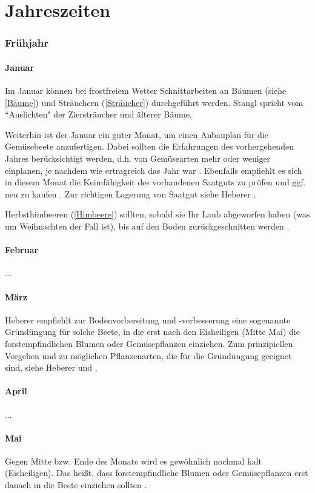 \part{Jahreszeiten}

\pagebreak

\section{Frühjahr}

\subsection{Januar}

Im Januar können bei frostfreiem Wetter Schnittarbeiten an \textrightarrow Bäumen (siehe \ref{Bäume}) und \textrightarrow Sträuchern (\ref{Sträucher}) durchgeführt werden.
Stangl \cite[S.~256]{Stangl1995} spricht vom ``Auslichten" der Ziersträucher und älterer Bäume.

Weiterhin ist der Januar ein guter Monat, um einen Anbauplan für die Gemüsebeete anzufertigen.
Dabei sollten die Erfahrungen des vorhergehenden Jahres berücksichtigt werden, d.h. von Gemüsearten mehr oder weniger einplanen, je nachdem wie ertragreich das Jahr war \cite[S.~256]{Stangl1995}.
Ebenfalls empfiehlt es sich in diesem Monat die Keimfähigkeit des vorhandenen Saatguts zu prüfen und ggf. neu zu kaufen \cite[S.~216]{Heberer2018}.
Zur richtigen Lagerung von Saatgut siehe Heberer \cite[S.~179]{Heberer2018}.

Herbsthimbeeren (\ref{Himbeere}) sollten, sobald sie Ihr Laub abgeworfen haben (was um Weihnachten der Fall ist), bis auf den Boden zurückgeschnitten werden \cite[S.~421]{Don2021}.

\subsection{Februar}

...

\subsection{März}
Heberer \cite[S.~11]{Heberer2018} empfiehlt zur Bodenvorbereitung und -verbesserung eine sogenannte Gründüngung für solche Beete, in die erst nach den Eisheiligen (Mitte Mai) die forstempfindlichen Blumen oder Gemüsepflanzen einziehen.
Zum prinzipiellen Vorgehen und zu möglichen Pflanzenarten, die für die Gründüngung geeignet sind, siehe Heberer \cite[S.~11]{Heberer2018} und \cite[S.~114f]{Heberer2018}.

\subsection{April}

...

\subsection{Mai}

Gegen Mitte bzw. Ende des Monats wird es gewöhnlich nochmal kalt (Eisheiligen).
Das heißt, dass forstempfindliche Blumen oder Gemüsepflanzen erst danach in die Beete einziehen sollten \cite[S.~11]{Heberer2018}.



\pagebreak
